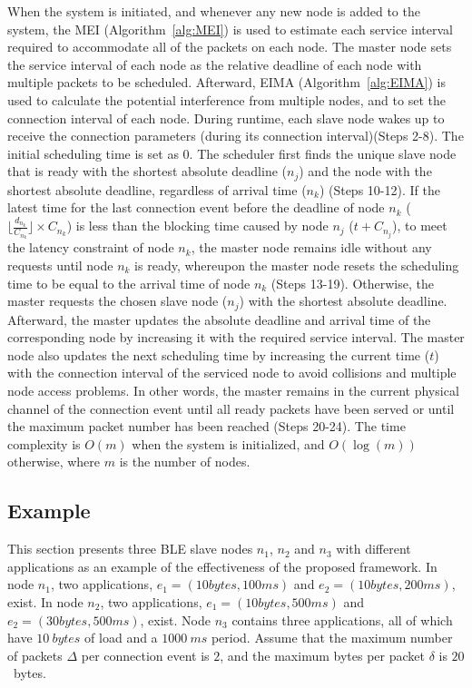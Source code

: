 \documentclass[10pt,journal,compsoc]{IEEEtran}
\begin{document}
When the system is initiated, and whenever any new node is added to the system, the MEI (Algorithm~\ref{alg:MEI}) is used to estimate each service interval required to accommodate all of the packets on each node. The master node sets the service interval of each node as the relative deadline of each node with multiple packets to be scheduled. Afterward, EIMA (Algorithm~\ref{alg:EIMA}) is used to calculate the potential interference from multiple nodes, and to set the connection interval of each node. During runtime, each slave node wakes up to receive the connection parameters (during its connection interval)(Steps 2-8). The initial scheduling time is set as $0$. The scheduler first finds the unique slave node that is ready with the shortest absolute deadline ($n_j$) and the node with the shortest absolute deadline, regardless of arrival time ($n_k$) (Steps 10-12). If the latest time for the last connection event before the deadline of node $n_k$ ($\lfloor \frac{d_{n_k}}{C_{n_k}} \rfloor \times C_{n_k}$) is less than the blocking time caused by node $n_j$ ($ t + C_{n_j}$), to meet the latency constraint of node $n_k$, the master node remains idle without any requests until node $n_k$ is ready, whereupon the master node resets the scheduling time to be equal to the arrival time of node $n_k$ (Steps 13-19). Otherwise, the master requests the chosen slave node ($n_j$) with the shortest absolute deadline. Afterward, the master updates the absolute deadline and arrival time of the corresponding node by increasing it with the required service interval. The master node also updates the next scheduling time by increasing the current time ($t$) with the connection interval of the serviced node to avoid collisions and multiple node access problems. In other words, the master remains in the current physical channel of the connection event until all ready packets have been served or until the maximum packet number has been reached (Steps 20-24). The time complexity is $O({m})$ when the system is initialized, and $O(\log(m))$ otherwise, where $m$ is the number of nodes.



\subsection{Example}\label{sec:example}
This section presents three BLE slave nodes $n_1$, $n_2$ and $n_3$ with different applications as an example of the effectiveness of the proposed framework. In node $n_1$, two applications, $e_1=(10bytes, 100ms)$ and $e_2=(10bytes, 200ms)$, exist. In node $n_2$, two applications, $e_1=(10bytes, 500ms)$ and $e_2=(30bytes, 500ms)$, exist. Node $n_3$ contains three applications, all of which have $10~bytes$ of load and a $1000~ms$ period.
Assume that the maximum number of packets $\Delta$ per connection event is $2$, and the maximum bytes per packet $\delta$ is $20$~bytes.
\end{document}
